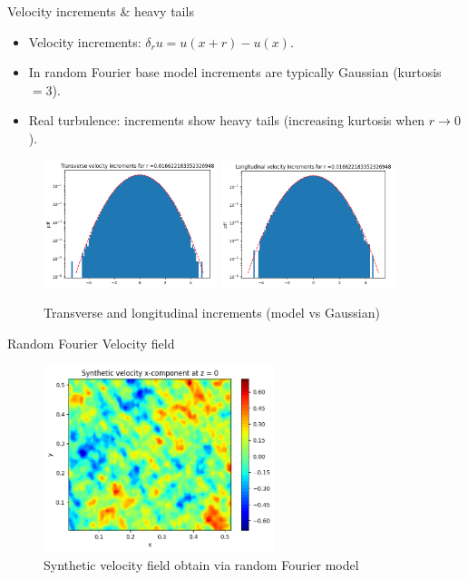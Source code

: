 \documentclass[11pt]{beamer}
\begin{document}
\begin{frame}{Velocity increments \& heavy tails}
  \begin{itemize}
    \item Velocity increments: $\delta_r u = u(x+r)-u(x)$.
    \item In random Fourier base model increments are typically Gaussian (kurtosis $=3$).
    \item Real turbulence: increments show heavy tails (increasing kurtosis when $r\to 0$).
  \end{itemize}
  \begin{figure}
    \centering
    \includegraphics[width=0.45\textwidth]{illustrations/TransVelIncrExample.png}
    \includegraphics[width=0.45\textwidth]{illustrations/LongVelIncrExample.png}
    \caption{Transverse and longitudinal increments (model vs Gaussian)}
  \end{figure}
\end{frame}

\begin{frame}{Random Fourier Velocity field}
  \begin{figure}
    \centering
    \includegraphics[width=0.6\textwidth]{illustrations/Velocity_Example.png}
    \caption{Synthetic velocity field obtain via random Fourier model}
  \end{figure}
\end{frame}
\end{document}
